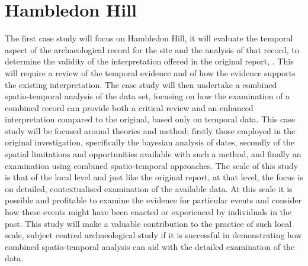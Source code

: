 \section{Hambledon Hill}
The first case study will focus on Hambledon Hill, it will evaluate the temporal aspect of the archaeological record for the site and the analysis of that record, to determine the validity of the interpretation offered in the original report, \citet{Mercer:2008fk}. This will require a review of the temporal evidence and of how the evidence supports the existing interpretation. The case study will then undertake a combined spatio-temporal analysis of the data set, focusing on how the examination of a combined record can provide both a critical review and an enhanced interpretation compared to the original, based only on temporal data. This case study will be focused around theories and method; firstly those employed in the original investigation, specifically the bayesian analysis of dates, secondly of the spatial limitations and opportunities available with such a method, and finally an examination using combined spatio-temporal approaches. The scale of this study is that of the local level and just like the original report, at that level, the focus is on detailed, contextualised examination of the available data. At this scale it is possible and profitable to examine the evidence for particular events and consider how these events might have been enacted or experienced by individuals in the past. This study will make a valuable contribution to the practice of such local scale, subject centred archaeological study if it is successful in demonstrating how combined spatio-temporal analysis can aid with the detailed examination of the data.

